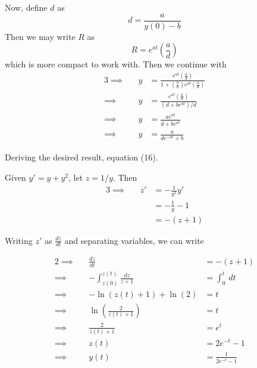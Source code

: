 \documentclass[a4paper]{article}
\begin{document}
Now, define \(d\) as
\[
	d = \frac{a}{y \!\left( 0 \right) - b}
\]
Then we may write \(R\) as
\[
	R = e^{at} \!\left( \frac{a}{d} \right) 
\]
which is more compact to work with. Then we continue with
\begin{alignat*}{3}
	\implies && y & = \frac{e^{at} \!\left( \frac{a}{d} \right) }{1 + \!\left( \frac{b}{a} \right) e^{at} \!\left( \frac{a}{d} \right) } \\
	\implies && y & = \frac{e^{at} \!\left( \frac{a}{d} \right) }{\!\left( d + be^{at} \right) / d}  \\ 
	\implies && y & = \frac{ae^{at}}{d + be^{at}} \\
	\implies && y & = \frac{a}{de^{-at} + b}
\end{alignat*}

Deriving the desired result, equation (16).

\vspace{12pt}


Given \(y' = y + y^{2}\), let \(z = 1/y\). Then
\begin{alignat*}{3}
	\implies && z' & = -\frac{1}{y^{2}}y' \\
	&& & = -\frac{1}{y} - 1 \\ 
	&& & = - \!\left( z + 1 \right) 
\end{alignat*}

Writing \(z'\) as \(\displaystyle{\frac{d z}{d t} }\) and separating variables, we can write

\begin{alignat*}{2}
	\implies && \frac{d z}{d t}  & = - \!\left( z + 1 \right)  \\
	\implies && - \int^{z \!\left( t \right) }_{z \!\left( 0 \right) } \frac{dz}{z + 1}  & = \int^{t}_{0} \, dt  \\ 
	\implies && -\ln\left( z \!\left( t \right) + 1 \right) + \ln\left( 2 \right) & = t \\
	\implies && \ln\left( \frac{2}{z \!\left( t \right)  + 1} \right) & = t \\
	\implies && \frac{2}{z \!\left( t \right) + 1} & = e^{t} \\
	\implies && z \!\left( t \right) & = 2e^{-t} - 1 \\
	\implies && y \!\left( t \right) & = \frac{1}{2e^{-t} - 1}
\end{alignat*}
\end{document}
